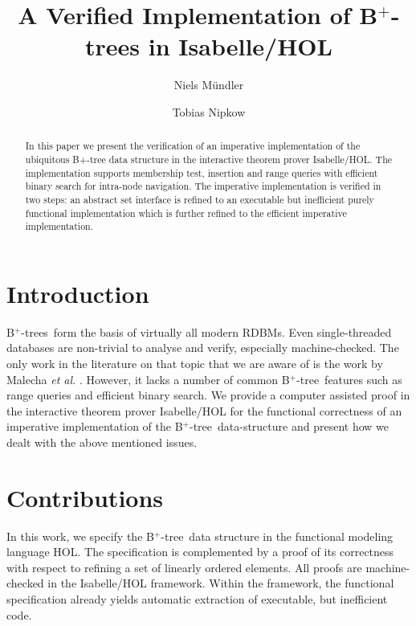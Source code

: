 \documentclass[a4paper,UKenglish,cleveref, autoref, thm-restate]{lipics-v2021}
\title{A Verified Implementation of B$^+$-trees in Isabelle/HOL}
\author{Niels Mündler}{Department of Computer Science, ETH Zurich, Switzerland}{nmuendler@ethz.ch}{https://orcid.org/0000-0003-3851-2557}{}%
\author{Tobias Nipkow}{Department of Informatics, Technical University of Munich, Germany}{nipkow@in.tum.de}{https://orcid.org/0000-0003-0730-515X}{}
\newcommand{\btree}{B$^+$-tree}
\newcommand{\btrees}{B$^+$-trees}
\begin{document}
\maketitle

\begin{abstract}
    In this paper we present the verification of an imperative
    implementation of the ubiquitous B+-tree data structure in the
    interactive theorem prover Isabelle/HOL. The implementation supports
    membership test, insertion and range queries with efficient binary
    search for intra-node navigation. The imperative implementation is
    verified in two steps: an abstract set interface is refined to an
    executable but inefficient purely functional implementation which is further
    refined to the efficient imperative implementation.
\end{abstract}

\section{Introduction}
\label{sec:introduction}

\btrees\ form the basis of virtually all modern RDBMs.
Even single-threaded databases are non-trivial to analyse and verify,
especially machine-checked.
The only work in the literature on that topic that we are aware of
is the work by Malecha \emph{et al.} \cite{DBLP:conf/popl/MalechaMSW10}.
However, it lacks a number of common \btree\ features such as range
queries and efficient binary search.
We provide a computer assisted proof in the interactive
theorem prover Isabelle/HOL \cite{DBLP:books/sp/NipkowK14} for the functional
correctness of an imperative implementation of the \btree\ data-structure
and present how we dealt with the above mentioned issues.



\section{Contributions}

In this work, we specify the \btree\ data structure in the
functional modeling language HOL.
The specification is complemented by a proof of its correctness
with respect to refining a set of linearly ordered elements.
All proofs are machine-checked in the Isabelle/HOL framework.
Within the framework,
the functional specification already yields automatic extraction of executable,
but inefficient code.
\end{document}
